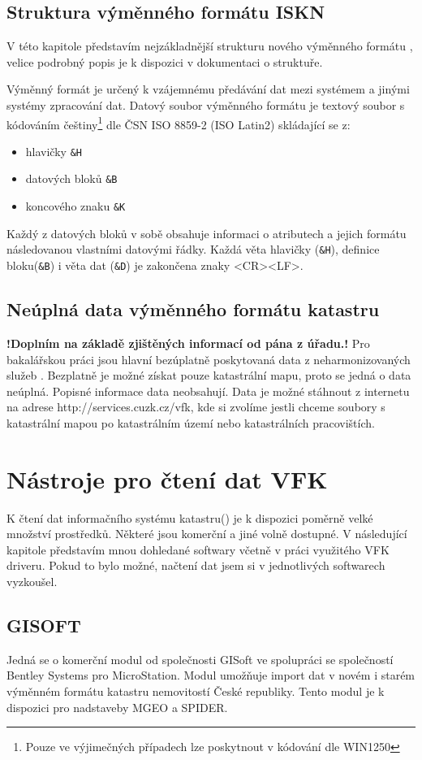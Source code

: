 \subsection{Struktura výměnného formátu ISKN}
V této kapitole představím nejzákladnější strukturu nového výměnného formátu , velice podrobný popis je k dispozici v dokumentaci o struktuře.\cite{struktura_ISKN}

Výměnný formát je určený k vzájemnému předávání dat mezi systémem  a jinými systémy zpracování dat. Datový soubor výměnného formátu je textový soubor s kódováním češtiny\footnote{Pouze ve výjimečných případech lze poskytnout v kódování dle WIN1250} dle ČSN ISO 8859-2 (ISO Latin2) skládající se z:
\begin{itemize}
		\item hlavičky \verb|&H|
		\item datových bloků \verb|&B|
		\item koncového znaku \verb|&K|
\end{itemize}
Každý z datových bloků v sobě obsahuje informaci o atributech a jejich formátu následovanou vlastními datovými řádky. Každá věta hlavičky (\verb|&H|), definice bloku(\verb|&B|) i věta dat (\verb|&D|) je zakončena znaky <CR><LF>. %
\subsection{Neúplná data výměnného formátu katastru}
\textbf{!Doplním na základě zjištěných informací od pána z úřadu.!} 
Pro bakalářskou práci jsou hlavní bezúplatně poskytovaná data z neharmonizovaných služeb . Bezplatně je možné získat pouze katastrální mapu, proto se jedná o data neúplná. Popisné informace data neobsahují. Data je možné stáhnout z internetu na adrese http://services.cuzk.cz/vfk, kde si zvolíme jestli chceme soubory s katastrální mapou po katastrálním území nebo katastrálních pracovištích.
\section{Nástroje pro čtení dat VFK} 
K čtení dat informačního systému katastru() je k dispozici poměrně velké množství prostředků. Některé jsou komerční a jiné volně dostupné. V následující kapitole představím mnou dohledané softwary včetně v práci využitého VFK driveru. Pokud to bylo možné, načtení dat jsem si v jednotlivých softwarech vyzkoušel.
\subsection{GISOFT}
Jedná se o komerční modul od společnosti GISoft ve spolupráci se společností Bentley Systems pro MicroStation. Modul umožňuje import dat v novém i starém výměnném formátu katastru nemovitostí České republiky. Tento modul je k dispozici pro nadstaveby MGEO a SPIDER.\cite{gisoft}

